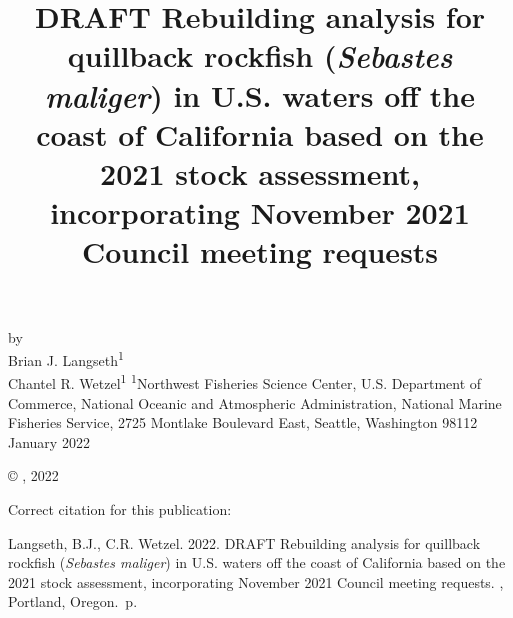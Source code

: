\documentclass[11pt,
  english,
  letterpaper,
]{article}
\date{}
\newcommand{\trTitle}{DRAFT Rebuilding analysis for quillback rockfish (\emph{Sebastes maliger}) in U.S. waters off the coast of California based on the 2021 stock assessment, incorporating November 2021 Council meeting requests}
\newcommand{\trYear}{2022}
\newcommand{\trMonth}{January}
\newcommand{\trAuthsBack}{Langseth, B.J., C.R. Wetzel}
\newcommand{\trCitation}{
\begin{hangparas}{1em}{1}
\trAuthsBack{}. \trYear{}. \trTitle{}. \glsentrylong{pfmc}, Portland, Oregon. \pageref{LastPage}{}\,p.
\end{hangparas}}
\begin{document}

\renewcommand*{\thefootnote}{\fnsymbol{footnote}}

\small
\thispagestyle{empty}
\noindent
\begin{center}
\title{DRAFT Rebuilding analysis for quillback rockfish (\emph{Sebastes maliger}) in U.S. waters off the coast of California based on the 2021 stock assessment, incorporating November 2021 Council meeting requests}
\vspace{1.5cm}
{\Large\textbf{}}
\vfill
by\\
Brian J. Langseth\textsuperscript{1}\\
Chantel R. Wetzel\textsuperscript{1}\vfill
\textsuperscript{1}Northwest Fisheries Science Center, U.S. Department of Commerce, National Oceanic and Atmospheric Administration, National Marine Fisheries Service, 2725 Montlake Boulevard East, Seattle, Washington 98112\vfill
\trMonth{} \trYear{}
\end{center}
\clearpage

\thispagestyle{empty}
\vspace*{\fill}
\begin{center}
\copyright{} , \trYear{}\\
\end{center}
\par
\bigskip
\noindent
Correct citation for this publication:
\bigskip
\par
\trCitation{}
\clearpage


\tableofcontents\clearpage
\label{TRlastRoman}
\clearpage

\newpage
\thispagestyle{empty} %

\pagestyle{plain}  %
\renewcommand*{\thefootnote}{\arabic{footnote}}  %
\setcounter{footnote}{0}  %
\renewcommand{\headrulewidth}{0.5pt}
\renewcommand{\footrulewidth}{0.5pt}
\end{document}
